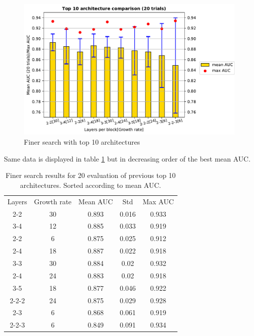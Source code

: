 \begin{figure}[ht]
\centering
\includegraphics[width=13cm,height=7cm]{images/densenet/siamese/densenet_siamese_finer_search}
\caption{Finer search with top 10 architectures}
\label{fig:arch_vs_auc_finer}
\end{figure}

Same data is displayed in table \ref{table:arch_vs_auc_finer_table} but in decreasing order of the best mean AUC.

\begin{table}[ht]
\centering
\caption[Finer search with 10 architectures]{Finer search results for 20 evaluation of previous top 10 architectures. Sorted according to mean AUC.}
 \begin{tabular}{|c c c c c|} 
 \hline\hline
 \rowcolor{lightgrey}
  Layers &  Growth rate &  Mean AUC &  Std &  Max AUC\\
  2-2 &  30 &  0.893 &  0.016 &  0.933\\
  3-4 &  12 &  0.885 &  0.033 &  0.919\\
  2-2 &  6 &  0.875 &  0.025 &  0.912\\
  2-4 &  18 &  0.887 &  0.022 &  0.918\\
  3-3 &  30 &  0.884 &  0.02 &  0.932\\
  2-4 &  24 &  0.883 &  0.02 &  0.918\\
  3-5 &  18 &  0.877 &  0.046 &  0.922\\
  2-2-2 &  24 &  0.875 &  0.029 &  0.928\\
  2-3 &  6 &  0.868 &  0.061 &  0.919\\
  2-2-3 &  6 &  0.849 &  0.091 &  0.934\\
  \hline \hline
\end{tabular}
\label{table:arch_vs_auc_finer_table}
\end{table}

